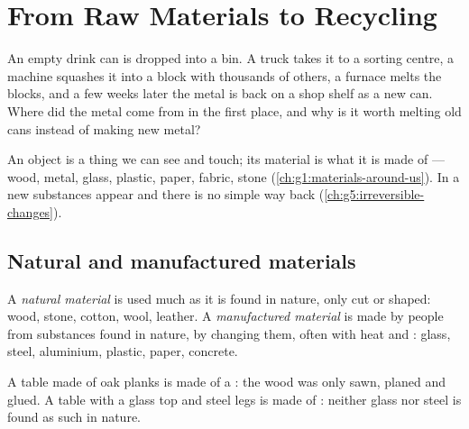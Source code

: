 \chapter{From Raw Materials to Recycling}\label{ch:g5:raw-materials-and-recycling}

An empty drink can is dropped into a  bin. A truck takes it to
a sorting centre, a machine squashes it into a block with thousands of
others, a furnace melts the blocks, and a few weeks later the metal is
back on a shop shelf as a new can. Where did the metal come from in the
first place, and why is it worth melting old cans instead of making new
metal?

\begin{recall}
An object is a thing we can see and touch; its material is what it is
made of --- wood, metal, glass, plastic, paper, fabric, stone
(\cref{ch:g1:materials-around-us}). In a  new substances
appear and there is no simple way back (\cref{ch:g5:irreversible-changes}).
\end{recall}

\section{Natural and manufactured materials}

\begin{definition}\label{def:g5:raw-materials-and-recycling:natural-material}
A \emph{natural material} is used much as it is
found in nature, only cut or shaped: wood, stone, cotton, wool, leather.
A \emph{manufactured material} is made by
people from substances found in nature, by changing them, often with
heat and : glass, steel, aluminium, plastic, paper,
concrete.
\end{definition}

\begin{example}\label{ex:g5:raw-materials-and-recycling:tables}
A table made of oak planks is made of a : the wood was
only sawn, planed and glued. A table with a glass top and steel legs is
made of : neither glass nor steel is found as such
in nature.
\end{example}


